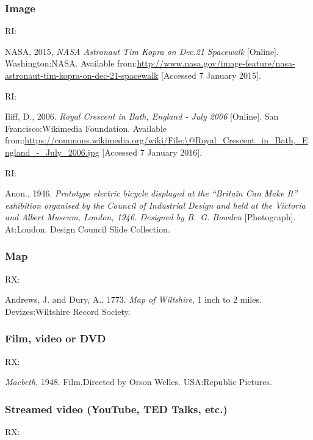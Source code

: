 \subsubsection*{Image}

RI: \cite{nasa2015nat}

NASA, 2015, \emph{NASA Astronaut Tim Kopra on Dec.\@ 21 Spacewalk} [Online]. Washington:\@ NASA. Available from:\@ \url{http://www.nasa.gov/image-feature/nasa-astronaut-tim-kopra-on-dec-21-spacewalk} [Accessed 7 January 2015].


RI: \cite{iliff2006rcb}

Iliff, D., 2006. \emph{Royal Crescent in Bath, England - July 2006} [Online]. San Francisco:\@ Wikimedia Foundation. Available from:\@ \url{https://commons.wikimedia.org/wiki/File:\@Royal_Crescent_in_Bath,_England_-_July_2006.jpg} [Accessed 7 January 2016].


RI: \cite{anon1946peb}

Anon., 1946. \emph{Prototype electric bicycle displayed at the \enquote{Britain Can Make It} exhibition organised by the Council of Industrial Design and held at the Victoria and Albert Museum, London, 1946. Designed by B.~G. Bowden} [Photograph]. At:\@ London. Design Council Slide Collection.



\subsubsection*{Map}

RX: \cite{andrews.dury1773wilts}

Andrews, J. and Dury, A., 1773. \emph{Map of Wiltshire}, 1 inch to 2 miles. Devizes:\@ Wiltshire Record Society.



\subsubsection*{Film, video or DVD}

RX: \cite{macbeth1948}

\emph{Macbeth}, 1948. Film.\@ Directed by Orson Welles. USA:\@ Republic Pictures.



\subsubsection*{Streamed video (YouTube, TED Talks, etc.)}

RX: \cite{moran2016sol}


